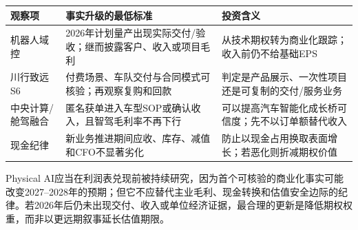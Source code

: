 \begin{exhibitbox}[未来机会的证据记分卡]
\small
\begin{tabularx}{\textwidth}{L{2.1cm}Y Y}
\toprule
观察项 & 事实升级的最低标准 & 投资含义 \\
\midrule
机器人域控 & 2026年计划量产出现实际交付/验收；继而披露客户、收入或项目毛利 & 从技术期权转为商业化跟踪；收入前仍不给基础EPS \\
川行致远S6 & 付费场景、车队交付与合同模式可核验；再观察复购和回款 & 判定是产品展示、一次性项目还是可复制的交付/服务业务 \\
中央计算/舱驾融合 & 匿名获单进入车型SOP或确认收入，且智驾毛利率不再下行 & 可以提高汽车智能化成长桥可信度；先不以订单额替代收入 \\
现金纪律 & 新业务推进期间应收、库存、减值和CFO不显著劣化 & 防止以现金占用换取表面增长；若恶化则折减期权价值 \\
\bottomrule
\end{tabularx}
\end{exhibitbox}

\begin{riskbox}[研究结论的边界]
Physical AI应当在利润表兑现前被持续研究，因为首个可核验的商业化事实可能改变2027--2028年的预期；但它不应替代主业毛利、现金转换和估值安全边际的纪律。若2026年后仍未出现交付、收入或单位经济证据，最合理的更新是降低期权权重，而非以更远期叙事延长估值期限。
\end{riskbox}
